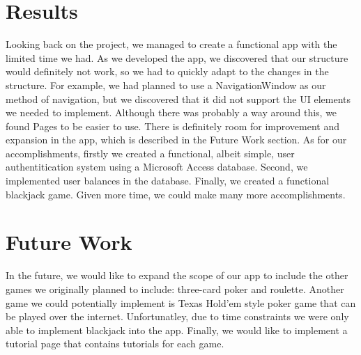 \documentclass[10pt,conference,onecolumn,compsoc]{IEEEtran}
\begin{document}
\section{Results}
Looking back on the project, we managed to create a functional app with the limited time we had. As we developed the app, we discovered that our structure would definitely not work, so we had to quickly adapt to the changes in the structure. For example, we had planned to use a NavigationWindow as our method of navigation, but we discovered that it did not support the UI elements we needed to implement. Although there was probably a way around this, we found Pages to be easier to use. There is definitely room for improvement and expansion in the app, which is described in the Future Work section. As for our accomplishments, firstly we created a functional, albeit simple, user authentitication system using a Microsoft Access database. Second, we implemented user balances in the database. Finally, we created a functional blackjack game. Given more time, we could make many more accomplishments.


\section{Future Work}
In the future, we would like to expand the scope of our app to include the other games we originally planned to include: three-card poker and roulette. Another game we could potentially implement is  Texas Hold'em style poker game that can be played over the internet. Unfortunatley, due to time constraints we were only able to implement blackjack into the app. Finally, we would like to implement a tutorial page that contains tutorials for each game. 
\end{document}
